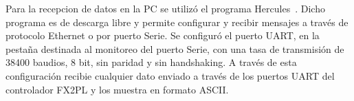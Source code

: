 



Para la recepcion de datos en la PC se utilizó el programa Hercules~\cite{HWGroup}. Dicho programa es de descarga libre y permite configurar y recibir mensajes a través de protocolo Ethernet o por puerto Serie. Se configuró el puerto UART, en la pestaña destinada al monitoreo del puerto Serie, con una tasa de transmisión de 38400 baudios, 8 bit, sin paridad y sin handshaking. A través de esta configuración recibie cualquier dato enviado a través de los puertos UART del controlador FX2PL y los muestra en formato ASCII.

